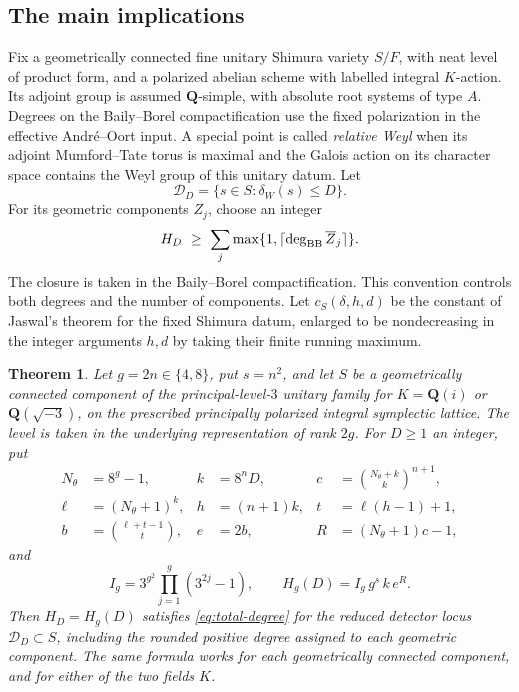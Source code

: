 \documentclass[11pt]{article}
\newtheorem{theorem}{Theorem}[section]
\theoremstyle{definition}
\theoremstyle{remark}
\newcommand{\Q}{\mathbf Q}
\begin{document}
\subsection{The main implications}

Fix a geometrically connected fine unitary Shimura variety $S/F$,
with neat level of product form, and a polarized abelian scheme
with labelled integral $K$-action. Its adjoint group is assumed
$\Q$-simple, with absolute root systems of type $A$. Degrees on
the Baily--Borel compactification use the fixed polarization in
the effective Andr\'e--Oort input. A special point is called
\emph{relative Weyl} when its adjoint Mumford--Tate torus is
maximal and the Galois action on its character space contains the
Weyl group of this unitary datum. Let
\[
 \mathcal D_D=\{s\in S:\delta_W(s)\leq D\}.
\]
For its geometric components $Z_j$, choose an integer
\begin{equation}
 H_D\ \geq\ \sum_j\max\{1,\lceil\deg_{\rm BB}\overline Z_j\rceil\}.
 \label{eq:total-degree}
\end{equation}
The closure is taken in the Baily--Borel compactification. This
convention controls both degrees and the number of components.
Let $c_S(\delta,h,d)$ be the constant of Jaswal's theorem for the
fixed Shimura datum, enlarged to be nondecreasing in the integer
arguments $h,d$ by taking their finite running maximum.

\begin{theorem}\label{thm:explicit-theta-chow-bound}
Let $g=2n\in\{4,8\}$, put $s=n^2$, and let $S$ be a geometrically
connected component of the principal-level-$3$ unitary family for
$K=\mathbf Q(i)$ or $\mathbf Q(\sqrt{-3})$, on the prescribed
principally polarized integral symplectic lattice.  The level is taken
in the underlying representation of rank $2g$.  For $D\geq1$ an
integer, put
\begin{align*}
 N_\theta&=8^g-1,& k&=8^nD,& c&=\binom{N_\theta+k}{k}^{n+1},\\
 \ell&=(N_\theta+1)^k,& h&=(n+1)k,& t&=\ell(h-1)+1,\\
 b&=\binom{\ell+t-1}{t},& e&=2b,& R&=(N_\theta+1)c-1,
\end{align*}
and
\[
 I_g=3^{g^2}\prod_{j=1}^{g}(3^{2j}-1),\qquad
 H_g(D)=I_g\,g^s\,k\,e^R.
\]
Then $H_D=H_g(D)$ satisfies \eqref{eq:total-degree} for the
reduced detector locus $\mathcal D_D\subset S$, including the
rounded positive degree assigned to each geometric component.  The same formula
works for each geometrically connected component, and for either of
the two fields $K$.
\end{theorem}
\end{document}
